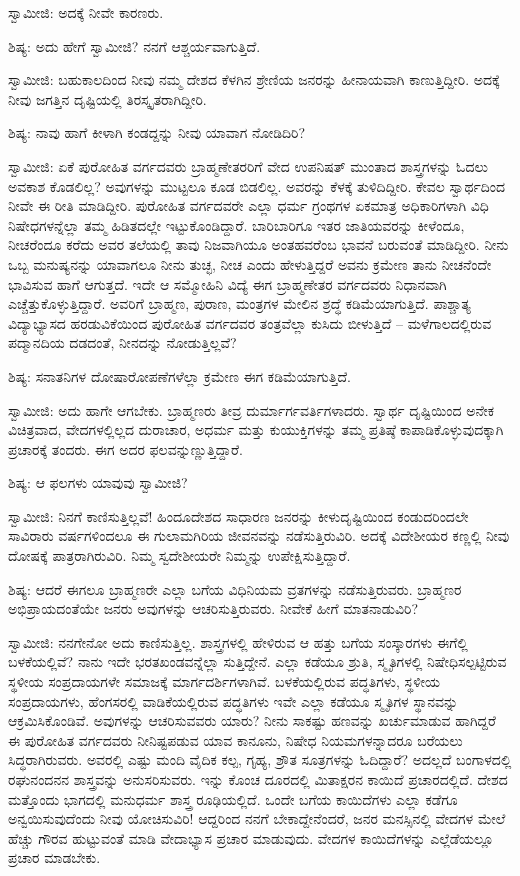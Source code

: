ಸ್ವಾಮೀಜಿ: ಅದಕ್ಕೆ ನೀವೇ ಕಾರಣರು.

ಶಿಷ್ಯ: ಅದು ಹೇಗೆ ಸ್ವಾಮೀಜಿ? ನನಗೆ ಆಶ್ಚರ್ಯವಾಗುತ್ತಿದೆ.

ಸ್ವಾಮೀಜಿ: ಬಹುಕಾಲದಿಂದ ನೀವು ನಮ್ಮ ದೇಶದ ಕೆಳಗಿನ ಶ್ರೇಣಿಯ ಜನರನ್ನು ಹೀನಾಯವಾಗಿ ಕಾಣುತ್ತಿದ್ದೀರಿ. ಅದಕ್ಕೆ ನೀವು ಜಗತ್ತಿನ ದೃಷ್ಟಿಯಲ್ಲಿ ತಿರಸ್ಕೃತರಾಗಿದ್ದೀರಿ.

ಶಿಷ್ಯ: ನಾವು ಹಾಗೆ ಕೀಳಾಗಿ ಕಂಡದ್ದನ್ನು ನೀವು ಯಾವಾಗ ನೋಡಿದಿರಿ?

ಸ್ವಾಮೀಜಿ: ಏಕೆ ಪುರೋಹಿತ ವರ್ಗದವರು ಬ್ರಾಹ್ಮಣೇತರರಿಗೆ ವೇದ ಉಪನಿಷತ್ ಮುಂತಾದ ಶಾಸ್ತ್ರಗಳನ್ನು ಓದಲು ಅವಕಾಶ ಕೊಡಲಿಲ್ಲ? ಅವುಗಳನ್ನು ಮುಟ್ಟಲೂ ಕೂಡ ಬಿಡಲಿಲ್ಲ. ಅವರನ್ನು ಕೆಳಕ್ಕೆ ತುಳಿದಿದ್ದೀರಿ. ಕೇವಲ ಸ್ವಾರ್ಥದಿಂದ ನೀವೇ ಈ ರೀತಿ ಮಾಡಿದ್ದೀರಿ. ಪುರೋಹಿತ ವರ್ಗದವರೇ ಎಲ್ಲಾ ಧರ್ಮ ಗ್ರಂಥಗಳ ಏಕಮಾತ್ರ ಅಧಿಕಾರಿಗಳಾಗಿ ವಿಧಿ ನಿಷೇಧಗಳನ್ನೆಲ್ಲಾ ತಮ್ಮ ಹಿಡಿತದಲ್ಲೇ ಇಟ್ಟುಕೊಂಡಿದ್ದಾರೆ. ಬಾರಿಬಾರಿಗೂ ಇತರ ಜಾತಿಯವರನ್ನು ಕೀಳೆಂದೂ, ನೀಚರೆಂದೂ ಕರೆದು ಅವರ ತಲೆಯಲ್ಲಿ ತಾವು ನಿಜವಾಗಿಯೂ ಅಂತಹವರೆಂಬ ಭಾವನೆ ಬರುವಂತೆ ಮಾಡಿದ್ದೀರಿ. ನೀನು ಒಬ್ಬ ಮನುಷ್ಯನನ್ನು ಯಾವಾಗಲೂ ನೀನು ತುಚ್ಛ, ನೀಚ ಎಂದು ಹೇಳುತ್ತಿದ್ದರೆ ಅವನು ಕ್ರಮೇಣ ತಾನು ನೀಚನೆಂದೇ ಭಾವಿಸುವ ಹಾಗೆ ಆಗುತ್ತದೆ. ಇದೇ ಆ ಸಮ್ಮೋಹಿನಿ ವಿದ್ಯೆ  ಈಗ ಬ್ರಾಹ್ಮಣೇತರ ವರ್ಗದವರು ನಿಧಾನವಾಗಿ ಎಚ್ಚೆತ್ತುಕೊಳ್ಳುತ್ತಿದ್ದಾರೆ. ಅವರಿಗೆ ಬ್ರಾಹ್ಮಣ, ಪುರಾಣ, ಮಂತ್ರಗಳ ಮೇಲಿನ ಶ್ರದ್ಧೆ ಕಡಿಮೆಯಾಗುತ್ತಿದೆ. ಪಾಶ್ಚಾತ್ಯ ವಿದ್ಯಾಭ್ಯಾಸದ ಹರಡುವಿಕೆಯಿಂದ ಪುರೋಹಿತ ವರ್ಗದವರ ತಂತ್ರವೆಲ್ಲಾ ಕುಸಿದು ಬೀಳುತ್ತಿದೆ – ಮಳೆಗಾಲದಲ್ಲಿರುವ ಪದ್ಮಾನದಿಯ ದಡದಂತೆ, ನೀನದನ್ನು ನೋಡುತ್ತಿಲ್ಲವೆ?

ಶಿಷ್ಯ: ಸನಾತನಿಗಳ ದೋಷಾರೋಪಣೆಗಳೆಲ್ಲಾ ಕ್ರಮೇಣ ಈಗ ಕಡಿಮೆಯಾಗುತ್ತಿದೆ.

ಸ್ವಾಮೀಜಿ: ಅದು ಹಾಗೇ ಆಗಬೇಕು. ಬ್ರಾಹ್ಮಣರು ತೀವ್ರ ದುರ್ಮಾರ್ಗವರ್ತಿಗಳಾದರು. ಸ್ವಾರ್ಥ ದೃಷ್ಟಿಯಿಂದ ಅನೇಕ ವಿಚಿತ್ರವಾದ, ವೇದಗಳಲ್ಲಿಲ್ಲದ ದುರಾಚಾರ, ಅಧರ್ಮ ಮತ್ತು ಕುಯುಕ್ತಿಗಳನ್ನು ತಮ್ಮ ಪ್ರತಿಷ್ಠೆ ಕಾಪಾಡಿಕೊಳ್ಳುವುದಕ್ಕಾಗಿ ಪ್ರಚಾರಕ್ಕೆ ತಂದರು. ಈಗ ಅದರ ಫಲವನ್ನುಣ್ಣುತ್ತಿದ್ದಾರೆ.

ಶಿಷ್ಯ: ಆ ಫಲಗಳು ಯಾವುವು ಸ್ವಾಮೀಜಿ?

ಸ್ವಾಮೀಜಿ: ನಿನಗೆ ಕಾಣಿಸುತ್ತಿಲ್ಲವೆ! ಹಿಂದೂದೇಶದ ಸಾಧಾರಣ ಜನರನ್ನು ಕೀಳುದೃಷ್ಟಿಯಿಂದ ಕಂಡುದರಿಂದಲೇ ಸಾವಿರಾರು ವರ್ಷಗಳಿಂದಲೂ ಈ ಗುಲಾಮಗಿರಿಯ ಜೀವನವನ್ನು ನಡೆಸುತ್ತಿರುವಿರಿ. ಅದಕ್ಕೆ ವಿದೇಶೀಯರ ಕಣ್ಣಲ್ಲಿ ನೀವು ದೋಷಕ್ಕೆ ಪಾತ್ರರಾಗಿರುವಿರಿ. ನಿಮ್ಮ ಸ್ವದೇಶೀಯರೇ ನಿಮ್ಮನ್ನು ಉಪೇಕ್ಷಿಸುತ್ತಿದ್ದಾರೆ.

ಶಿಷ್ಯ: ಆದರೆ ಈಗಲೂ ಬ್ರಾಹ್ಮಣರೇ ಎಲ್ಲಾ ಬಗೆಯ ವಿಧಿನಿಯಮ ವ್ರತಗಳನ್ನು ನಡೆಸುತ್ತಿರುವರು. ಬ್ರಾಹ್ಮಣರ ಅಭಿಪ್ರಾಯದಂತೆಯೇ ಜನರು ಅವುಗಳನ್ನು ಆಚರಿಸುತ್ತಿರುವರು. ನೀವೇಕೆ ಹೀಗೆ ಮಾತನಾಡುವಿರಿ?

ಸ್ವಾಮೀಜಿ: ನನಗೇನೋ ಅದು ಕಾಣಿಸುತ್ತಿಲ್ಲ. ಶಾಸ್ತ್ರಗಳಲ್ಲಿ ಹೇಳಿರುವ ಆ ಹತ್ತು ಬಗೆಯ ಸಂಸ್ಕಾರಗಳು ಈಗೆಲ್ಲಿ ಬಳಕೆಯಲ್ಲಿವೆ? ನಾನು ಇದೇ ಭರತಖಂಡವನ್ನೆಲ್ಲಾ ಸುತ್ತಿದ್ದೇನೆ. ಎಲ್ಲಾ ಕಡೆಯೂ ಶ್ರುತಿ, ಸ್ಮೃತಿಗಳಲ್ಲಿ ನಿಷೇಧಿಸಲ್ಪಟ್ಟಿರುವ ಸ್ಥಳೀಯ ಸಂಪ್ರದಾಯಗಳೇ ಸಮಾಜಕ್ಕೆ ಮಾರ್ಗದರ್ಶಿಗಳಾಗಿವೆ. ಬಳಕೆಯಲ್ಲಿರುವ ಪದ್ಧತಿಗಳು, ಸ್ಥಳೀಯ ಸಂಪ್ರದಾಯಗಳು, ಹೆಂಗಸರಲ್ಲಿ ವಾಡಿಕೆಯಲ್ಲಿರುವ ಪದ್ಧತಿಗಳು ಇವೇ ಎಲ್ಲಾ ಕಡೆಯೂ ಸ್ಮೃತಿಗಳ ಸ್ಥಾನವನ್ನು ಆಕ್ರಮಿಸಿಕೊಂಡಿವೆ. ಅವುಗಳನ್ನು ಆಚರಿಸುವವರು ಯಾರು? ನೀನು ಸಾಕಷ್ಟು ಹಣವನ್ನು ಖರ್ಚುಮಾಡುವ ಹಾಗಿದ್ದರೆ ಈ ಪುರೋಹಿತ ವರ್ಗದವರು ನೀನಿಷ್ಟಪಡುವ ಯಾವ ಕಾನೂನು, ನಿಷೇಧ ನಿಯಮಗಳನ್ನಾದರೂ ಬರೆಯಲು ಸಿದ್ಧರಾಗಿರುವರು. ಅವರಲ್ಲಿ ಎಷ್ಟು ಮಂದಿ ವೈದಿಕ ಕಲ್ಪ, ಗೃಹ್ಯ, ಶ್ರೌತ ಸೂತ್ರಗಳನ್ನು ಓದಿದ್ದಾರೆ? ಅದಲ್ಲದೆ ಬಂಗಾಳದಲ್ಲಿ ರಘುನಂದನನ ಶಾಸ್ತ್ರವನ್ನು ಅನುಸರಿಸುವರು. ಇನ್ನು ಕೊಂಚ ದೂರದಲ್ಲಿ ಮಿತಾಕ್ಷರನ ಕಾಯಿದೆ ಪ್ರಚಾರದಲ್ಲಿದೆ. ದೇಶದ ಮತ್ತೊಂದು ಭಾಗದಲ್ಲಿ ಮನುಧರ್ಮ ಶಾಸ್ತ್ರ ರೂಢಿಯಲ್ಲಿದೆ. ಒಂದೇ ಬಗೆಯ ಕಾಯಿದೆಗಳು ಎಲ್ಲಾ ಕಡೆಗೂ ಅನ್ವಯಿಸುವುದೆಂದು ನೀವು ಯೋಚಿಸುವಿರಿ! ಆದ್ದರಿಂದ ನನಗೆ ಬೇಕಾದ್ದೇನೆಂದರೆ, ಜನರ ಮನಸ್ಸಿನಲ್ಲಿ ವೇದಗಳ ಮೇಲೆ ಹೆಚ್ಚು ಗೌರವ ಹುಟ್ಟುವಂತೆ ಮಾಡಿ ವೇದಾಭ್ಯಾಸ ಪ್ರಚಾರ ಮಾಡುವುದು. ವೇದಗಳ ಕಾಯಿದೆಗಳನ್ನು ಎಲ್ಲೆಡೆಯಲ್ಲೂ ಪ್ರಚಾರ ಮಾಡಬೇಕು.

